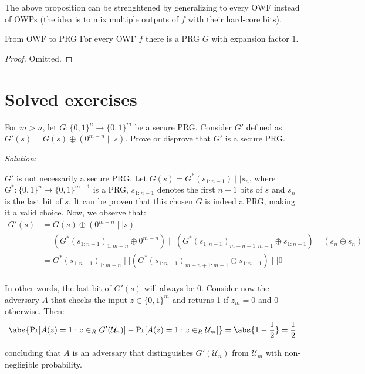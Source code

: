 \documentclass[a4paper, 12pt]{report}
\begin{document}
    The above proposition can be strenghtened by generalizing to every OWF instead of OWPs (the idea is to mix multiple outputs of $f$ with their hard-core bits).

    \begin{framedthm}{From OWF to PRG}
        For every OWF $f$ there is a PRG $G$ with expansion factor $1$.
    \end{framedthm}

    \begin{proof}
        Omitted.
    \end{proof}

    \section{Solved exercises}

    \begin{framedprob}{}
        For $m > n$, let $G : \{0,1\}^n \to \{0,1\}^m$ be a secure PRG. Consider $G'$ defined as $G'(s) = G(s) \oplus (0^{m-n} \mid\mid s)$. Prove or disprove that $G'$ is a secure PRG.
    \end{framedprob}

    \textit{Solution}:

    $G'$ is not necessarily a secure PRG. Let $G(s) = G^*(s_{1:n-1}) \mid\mid s_n$, where $G^* : \{0,1\}^n \to \{0,1\}^{m-1}$ is a PRG, $s_{1:n-1}$ denotes the first $n-1$ bits of $s$ and $s_n$ is the last bit of $s$. It can be proven that this chosen $G$ is indeed a PRG, making it a valid choice. Now, we observe that:
    \[\begin{split}
        G'(s) &= G(s) \oplus (0^{m-n} \mid\mid s) \\
        &= (G^*(s_{1:n-1})_{1:m-n} \oplus 0^{m-n}) \mid\mid (G^*(s_{1:n-1})_{m-n+1:m-1} \oplus s_{1:n-1}) \mid\mid (s_n \oplus s_n) \\
        &= G^*(s_{1:n-1})_{1:m-n} \mid\mid (G^*(s_{1:n-1})_{m-n+1:m-1} \oplus s_{1:n-1}) \mid\mid 0 \\
    \end{split}\]

    In other words, the last bit of $G'(s)$ will always be 0. Consider now the adversary $A$ that checks the input $z \in \{0,1\}^{m}$ and returns 1 if $z_m = 0$ and 0 otherwise. Then:
    \[\abs{\Pr[A(z) = 1 : z \in_R G'(\mathcal{U}_n)] - \Pr[A(z) = 1 : z \in_R \mathcal{U}_m]} = \abs{1-\frac{1}{2}} = \frac{1}{2}\]

    concluding that $A$ is an adversary that distinguishes $G'(\mathcal{U}_n)$ from $\mathcal{U}_m$ with non-negligible probability.
\end{document}
